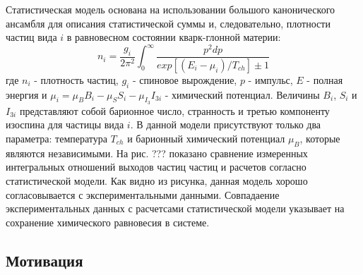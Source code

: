 Статистическая модель основана на использовании большого канонического ансамбля для описания статистической суммы и, следовательно, плотности частиц вида $i$ в равновесном состоянии кварк-глонной материи:
\begin{equation}
	\label{eq:Ratio}
	n_i = \frac{g_i}{2 \pi ^2}\int_0^{\infty} \frac{p^2 dp}{exp[(E_i - \mu_i)/T_{ch}]\pm 1}
\end{equation}
где  $n_i$ - плотность частиц, $g_i$ - спиновое вырождение, $p$ - импульс, $E$ - полная энергия и $\mu_i =\mu_B B_i - \mu_S S_i - \mu_{I_3} I_{3i}$ - химический потенциал. Величины $B_i$, $S_i$ и $I_{3i}$ представляют собой барионное число, странность и третью компоненту изоспина для частицы вида $i$. В данной модели присутствуют только два параметра: температура $T_{ch}$ и барионный химический потенциал $\mu_B$, которые являются независимыми.  На рис. ??? показано сравнение измеренных интегральных отношений выходов частиц частиц и расчетов согласно статистической модели. Как видно из рисунка, данная модель хорошо согласовывается с экспериментальными данными.
Совпадаение экспериментальных данных с расчетсами статистической модели указывает на сохранение химического равновесия в системе. 

\subsection{Мотивация}


